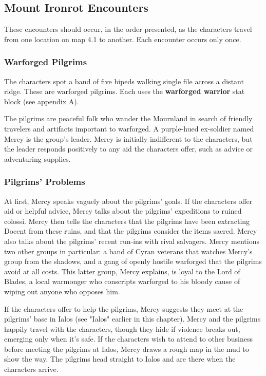 \documentclass[10pt,a4paper,twoside,bg=print,twocolumn,openany,nodeprecatedcode]{dndbook}
\begin{document}
\subsection{Mount Ironrot Encounters}
These encounters should occur, in the order presented, as the characters travel from one location on map 4.1 to another. Each encounter occurs only once.

\subsubsection{Warforged Pilgrims}
The characters spot a band of five bipeds walking single file across a distant ridge. These are warforged pilgrims. Each uses the \textbf{warforged warrior} stat block (see appendix A).

The pilgrims are peaceful folk who wander the Mournland in search of friendly travelers and artifacts important to warforged. A purple-hued ex-soldier named Mercy is the group's leader. Mercy is initially indifferent to the characters, but the leader responds positively to any aid the characters offer, such as advice or adventuring supplies.

\subsubsection{Pilgrims' Problems}
At first, Mercy speaks vaguely about the pilgrims' goals. If the characters offer aid or helpful advice, Mercy talks about the pilgrims' expeditions to ruined colossi. Mercy then tells the characters that the pilgrims have been extracting Docent from these ruins, and that the pilgrims consider the items sacred. Mercy also talks about the pilgrims' recent run-ins with rival salvagers. Mercy mentions two other groups in particular: a band of Cyran veterans that watches Mercy's group from the shadows, and a gang of openly hostile warforged that the pilgrims avoid at all costs. This latter group, Mercy explains, is loyal to the Lord of Blades, a local warmonger who conscripts warforged to his bloody cause of wiping out anyone who opposes him.

If the characters offer to help the pilgrims, Mercy suggests they meet at the pilgrims' base in Ialos (see "Ialos" earlier in this chapter). Mercy and the pilgrims happily travel with the characters, though they hide if violence breaks out, emerging only when it's safe. If the characters wish to attend to other business before meeting the pilgrims at Ialos, Mercy draws a rough map in the mud to show the way. The pilgrims head straight to Ialos and are there when the characters arrive.
\end{document}
